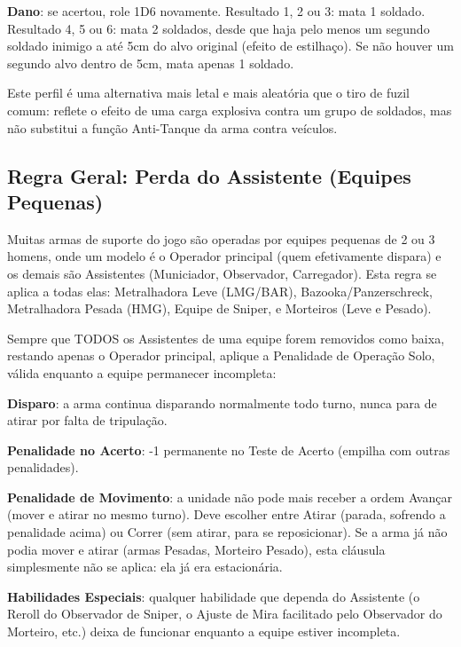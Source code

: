 \textbf{Dano}: se acertou, role 1D6 novamente. Resultado 1, 2 ou 3: mata 1 soldado. Resultado 4, 5 ou 6: mata 2 soldados, desde que haja pelo menos um segundo soldado inimigo a até 5cm do alvo original (efeito de estilhaço). Se não houver um segundo alvo dentro de 5cm, mata apenas 1 soldado.

\begin{nota}
Este perfil é uma alternativa mais letal e mais aleatória que o tiro de fuzil comum: reflete o efeito de uma carga explosiva contra um grupo de soldados, mas não substitui a função Anti-Tanque da arma contra veículos.
\end{nota}

\subsection{Regra Geral: Perda do Assistente (Equipes Pequenas)}
\label{sec:perda-assistente}

Muitas armas de suporte do jogo são operadas por equipes pequenas de 2 ou 3 homens, onde um modelo é o Operador principal (quem efetivamente dispara) e os demais são Assistentes (Municiador, Observador, Carregador). Esta regra se aplica a todas elas: Metralhadora Leve (LMG/BAR), Bazooka/Panzerschreck, Metralhadora Pesada (HMG), Equipe de Sniper, e Morteiros (Leve e Pesado).

Sempre que TODOS os Assistentes de uma equipe forem removidos como baixa, restando apenas o Operador principal, aplique a Penalidade de Operação Solo, válida enquanto a equipe permanecer incompleta:

\textbf{Disparo}: a arma continua disparando normalmente todo turno, nunca para de atirar por falta de tripulação.

\textbf{Penalidade no Acerto}: -1 permanente no Teste de Acerto (empilha com outras penalidades).

\textbf{Penalidade de Movimento}: a unidade não pode mais receber a ordem Avançar (mover e atirar no mesmo turno). Deve escolher entre Atirar (parada, sofrendo a penalidade acima) ou Correr (sem atirar, para se reposicionar). Se a arma já não podia mover e atirar (armas Pesadas, Morteiro Pesado), esta cláusula simplesmente não se aplica: ela já era estacionária.

\textbf{Habilidades Especiais}: qualquer habilidade que dependa do Assistente (o Reroll do Observador de Sniper, o Ajuste de Mira facilitado pelo Observador do Morteiro, etc.) deixa de funcionar enquanto a equipe estiver incompleta.

